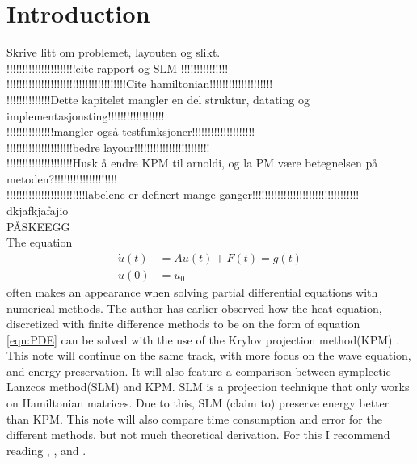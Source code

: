 \chapter{Introduction}
Skrive litt om problemet, layouten og slikt. \\
!!!!!!!!!!!!!!!!!!!!!!cite rapport og SLM !!!!!!!!!!!!!!!\\
!!!!!!!!!!!!!!!!!!!!!!!!!!!!!!!!!!!!!!Cite hamiltonian!!!!!!!!!!!!!!!!!!!!\\
!!!!!!!!!!!!!!Dette kapitelet mangler en del struktur, datating og implementasjonsting!!!!!!!!!!!!!!!!!!\\
!!!!!!!!!!!!!!!mangler også testfunksjoner!!!!!!!!!!!!!!!!!!!!\\
!!!!!!!!!!!!!!!!!!!!!bedre layour!!!!!!!!!!!!!!!!!!!!!!!!\\
!!!!!!!!!!!!!!!!!!!!!Husk å endre KPM til arnoldi, og la PM være betegnelsen på metoden?!!!!!!!!!!!!!!!!!!!!\\
!!!!!!!!!!!!!!!!!!!!!!!!!labelene er definert mange ganger!!!!!!!!!!!!!!!!!!!!!!!!!!!!!!!!!!\\
{\color{red} dkjafkjafajio } \\
{\color{red} PÅSKEEGG } \\
The equation 
\begin{equation} 
\begin{aligned}
\dot{u}(t) &= A u(t) + F(t) = g(t) \\
u(0)&= u_0
\end{aligned}
\label{eqn:PDE}
\end{equation}
often makes an appearance when solving partial differential equations with numerical methods. The author has earlier observed how the heat equation, discretized with finite difference methods to be on the form of equation \eqref{eqn:PDE} can be solved with the use of the Krylov projection method(KPM) \cite{min}. This note will continue on the same track, with more focus on the wave equation, and energy preservation. It will also feature a comparison between symplectic Lanzcos method(SLM) \cite{SLM} and KPM. SLM is a projection technique that only works on Hamiltonian matrices. Due to this, SLM (claim to) preserve energy better than KPM. This note will also compare time consumption and error for the different methods, but not much theoretical derivation. For this I recommend reading \cite{elena}, \cite{min}, and \cite{luli}. \\

